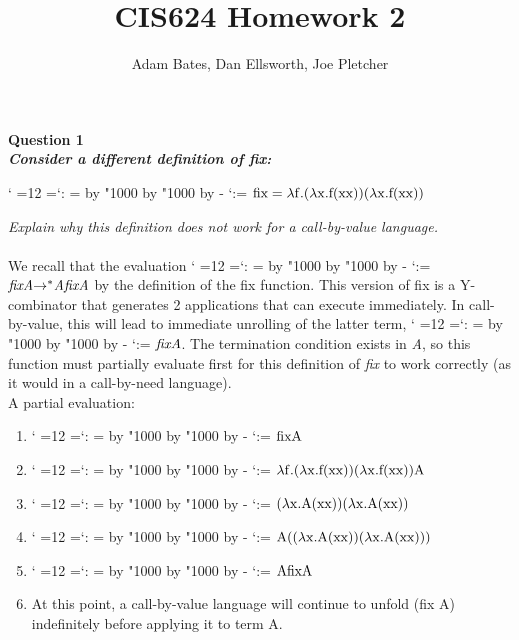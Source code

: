 \documentclass[12pt,letterpaper]{article}
\title{CIS624 Homework 2}
\author{Adam Bates, Dan Ellsworth, Joe Pletcher}
\makeatletter
\newcommand{\hwSect}[1] {\noindent\large\bf#1\rm\normalsize}
\newenvironment{lambdac}
  {\catcode` =12 \setupspace
   \makeordinary{:}%
   $\mathgroup0 }
  {$}
{\catcode` =\active\gdef\setupspace{\def {\;}}}
\newcommand{\makeordinary}[1]{\@tempcnta=\mathcode`#1
  \@tempcntb=\@tempcnta
  \divide\@tempcntb by "1000
  \multiply\@tempcntb by "1000
  \advance\@tempcnta by -\@tempcntb
  \mathcode`#1=\@tempcnta}
\makeatother
\begin{document}
\maketitle
\noindent

\hwSect{Question 1}\\
{\it Consider a different definition of fix:}
\begin{center}
\begin{lambdac}
fix = \lambda f. (\lambda x. f (x x ))(\lambda x. f (x x ))
\end{lambdac}
\end{center}
{\it Explain why this definition does not work for a call-by-value language.}\\ \\
\noindent
We recall that the evaluation \begin{lambdac}\it fix A {\rightarrow}^{\ast} A fix A \end{lambdac} by the definition of the fix function.  This version of fix is a Y-combinator that generates 2 applications that can execute immediately.  In call-by-value, this will lead to immediate unrolling of the latter term, \begin{lambdac}\it fix A \end{lambdac}.  The termination condition exists in {\it A}, so this function must partially evaluate first for this definition of {\it fix} to work correctly (as it would in a call-by-need language).\\

\noindent
A partial evaluation:\\

\begin{enumerate}
\item \begin{lambdac} fix A\end{lambdac}
\item \begin{lambdac}\lambda f. (\lambda x. f (x x ))(\lambda x. f (x x )) A\end{lambdac}
\item \begin{lambdac}(\lambda x. A (x x))(\lambda x. A (x x))\end{lambdac}
\item \begin{lambdac}A ((\lambda x. A (x x) ) (\lambda x. A (x x)))\end{lambdac}
\item \begin{lambdac}A fix A\end{lambdac}
\item At this point, a call-by-value language will continue to unfold (fix A) indefinitely before applying it to term A.
\end{enumerate}
\end{document}
